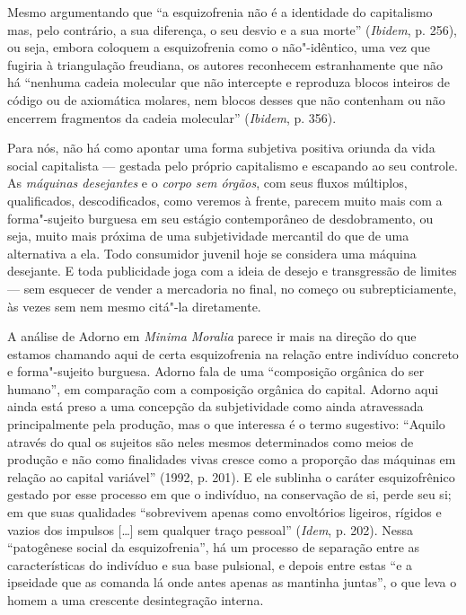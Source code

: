 Mesmo argumentando que ``a esquizofrenia não é a identidade do
capitalismo mas, pelo contrário, a sua diferença, o seu desvio e a sua
morte'' (\emph{Ibidem}, p. 256), ou seja, embora coloquem a esquizofrenia
como o não"-idêntico, uma vez que fugiria à triangulação freudiana, os
autores reconhecem estranhamente que não há ``nenhuma cadeia molecular
que não intercepte e reproduza blocos inteiros de código ou de
axiomática molares, nem blocos desses que não contenham ou não encerrem
fragmentos da cadeia molecular'' (\emph{Ibidem}, p. 356).

Para nós, não há como apontar uma forma subjetiva positiva oriunda da
vida social capitalista --- gestada pelo próprio capitalismo e escapando
ao seu controle. As \emph{máquinas desejantes} e o \emph{corpo sem
órgãos}, com seus fluxos múltiplos, qualificados, descodificados, como
veremos à frente, parecem muito mais com a forma"-sujeito burguesa em seu
estágio contemporâneo de desdobramento, ou seja, muito mais próxima de
uma subjetividade mercantil do que de uma alternativa a ela. Todo consumidor
juvenil hoje se considera uma máquina desejante. E toda publicidade joga
com a ideia de desejo e transgressão de limites --- sem esquecer de vender
a mercadoria no final, no começo ou subrepticiamente, às vezes sem nem
mesmo citá"-la diretamente.

A análise de Adorno em \emph{Minima Moralia} parece ir mais na direção
do que estamos chamando aqui de certa esquizofrenia na relação entre
indivíduo concreto e forma"-sujeito burguesa. Adorno fala de uma
``composição orgânica do ser humano'', em comparação com a composição
orgânica do capital. Adorno aqui ainda está preso a uma concepção da
subjetividade como ainda atravessada principalmente pela produção, mas o
que interessa é o termo sugestivo: ``Aquilo através do qual os sujeitos
são neles mesmos determinados como meios de produção e não como
finalidades vivas cresce como a proporção das máquinas em relação ao
capital variável'' (1992, p. 201). E ele sublinha o caráter
esquizofrênico gestado por esse processo em que o indivíduo, na
conservação de si, perde seu si; em que suas qualidades ``sobrevivem
apenas como envoltórios ligeiros, rígidos e vazios dos impulsos
[\ldots{}] sem qualquer traço pessoal'' (\emph{Idem}, p. 202).
Nessa ``patogênese social da esquizofrenia'', há um processo de
separação entre as características do indivíduo e sua base pulsional, e
depois entre estas ``e a ipseidade que as comanda lá onde antes apenas
as mantinha juntas'', o que leva o homem a uma crescente desintegração
interna.

